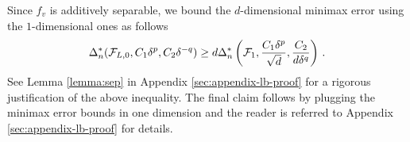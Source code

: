 Since $f_v$ is additively separable, we bound the $d$-dimensional minimax error using the $1$-dimensional ones as follows
% 
% 
% 
\begin{align*}
\Delta_n^*(\mathcal{F}_{L,0}, C_1 \delta^p ,C_2 \delta^{-q}) \ge d \Delta_n^{*}\left(\mathcal{F}_1,\frac{C_1\delta^p}{\sqrt d}, \frac{C_2}{d\delta^q}\right)\,. 
\end{align*}
See Lemma \ref{lemma:sep} in Appendix \ref{sec:appendix-lb-proof} for a rigorous justification of the above inequality. 
The final claim follows by plugging the minimax error bounds in one dimension and the reader is referred to Appendix \ref{sec:appendix-lb-proof} for details.

